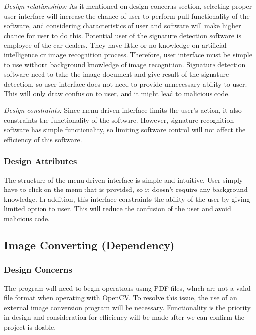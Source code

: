 \documentclass[onecolumn, draftclsnofoot,10pt, compsoc]{IEEEtran}
\begin{document}
\emph{Design relationships:}
As it mentioned on design concerns section, selecting proper user interface will increase the chance of user to perform pull functionality of the software, and considering characteristics of user and software will make higher chance for user to do this. Potential user of the signature detection software is employee of the car dealers. They have little or no knowledge on artificial intelligence or image recognition process. Therefore, user interface must be simple to use without background knowledge of image recognition. Signature detection software need to take the image document and give result of the signature detection, so user interface does not need to provide unnecessary ability to user. This will only draw confusion to user, and it might lead to malicious code.

\emph{Design constraints:}
Since menu driven interface limits the user’s action, it also constraints the functionality of the software. However, signature recognition software has simple functionality, so limiting software control will not affect the efficiency of this software.

\subsubsection{Design Attributes}
The structure of the menu driven interface is simple and intuitive. User simply have to click on the menu that is provided, so it doesn’t require any background knowledge. In addition, this interface constraints the ability of the user by giving limited option to user. This will reduce the confusion of the user and avoid malicious code.




\subsection{Image Converting (Dependency)}
\subsubsection{Design Concerns}
The program will need to begin operations using PDF files, which are not a valid file format when operating with OpenCV. To resolve this issue, the use of an external image conversion program will be necessary. Functionality is the priority in design and consideration for efficiency will be made after we can confirm the project is doable. 
\end{document}
